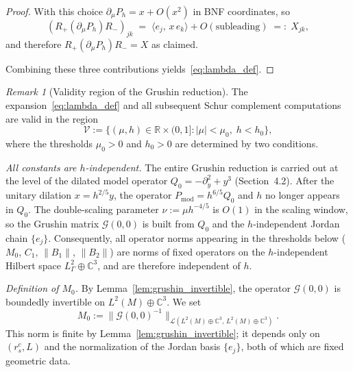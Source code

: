 \documentclass[12pt,a4paper]{amsart}
\theoremstyle{remark}
\newtheorem{remark}[theorem]{Remark}
\begin{document}
\begin{proof}
With this choice $\partial_{\mu}P_{h} = x + O(x^{2})$ in BNF coordinates, so
\[
  (R_{+}(\partial_{\mu}P_{h})R_{-})_{jk}
  \;=\; \langle e_{j},\,x\,e_{k}\rangle + O(\text{subleading})
  \;=:\; X_{jk},
\]
and therefore $R_{+}(\partial_{\mu}P_{h})R_{-} = X$ as claimed.

Combining these three contributions yields~\eqref{eq:lambda_def}.
\end{proof}

\begin{remark}[Validity region of the Grushin reduction]
\label{rem:grushin_validity}
The expansion~\eqref{eq:lambda_def} and all subsequent Schur complement computations are
valid in the region
\[
  \mathcal{V} := \bigl\{(\mu, h) \in \mathbb{R} \times (0,1] :
    |\mu| < \mu_0,\; h < h_0 \bigr\},
\]
where the thresholds $\mu_0 > 0$ and $h_0 > 0$ are determined by two conditions.

\emph{All constants are $h$-independent.}
The entire Grushin reduction is carried out at the level of the dilated
model operator $Q_0 = -\partial_y^2 + y^3$ (Section~4.2).  After the
unitary dilation $x = h^{2/5}y$, the operator $P_{\mathrm{mod}} = h^{6/5}Q_0$
and $h$ no longer appears in $Q_0$.  The double-scaling parameter
$\nu := \mu h^{-4/5}$ is $O(1)$ in the scaling window, so the
Grushin matrix $\mathcal{G}(0,0)$ is built from $Q_0$ and the
$h$-independent Jordan chain $\{e_j\}$.  Consequently, all operator
norms appearing in the thresholds below ($M_0$, $C_1$, $\|B_1\|$,
$\|B_2\|$) are norms of fixed operators on the $h$-independent Hilbert
space $L^2_\Gamma \oplus \mathbb{C}^3$, and are therefore independent of
$h$.

\emph{Definition of $M_0$.}
By Lemma~\ref{lem:grushin_invertible}, the operator $\mathcal{G}(0,0)$ is boundedly
invertible on $L^2(M)\oplus\mathbb{C}^3$.
We set
\[
  M_0 := \|\mathcal{G}(0,0)^{-1}\|_{\mathcal{L}(L^2(M)\oplus\mathbb{C}^3,\,L^2(M)\oplus\mathbb{C}^3)}.
\]
This norm is finite by Lemma~\ref{lem:grushin_invertible}; it depends only on
$(r_s^c, L)$ and the normalization of the Jordan basis $\{e_j\}$, both of which
are fixed geometric data.


\end{remark}
\end{document}
